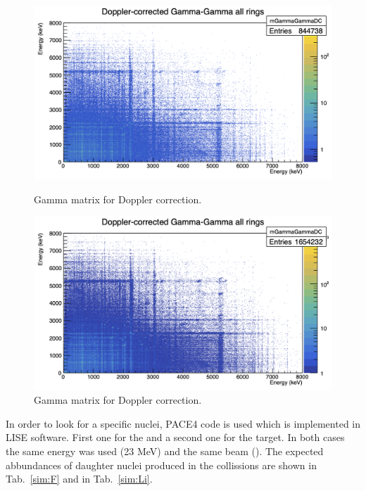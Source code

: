 \begin{figure}[h]
  \centering
  \begin{minipage}[b]{0.45\textwidth}
    \vspace{5mm}
    \includegraphics[width=\textwidth]{img/matrix_F.png}
    \caption{Gamma matrix for  Doppler correction.}
    \label{matrix:F}
  \end{minipage}
  \hfill
  \begin{minipage}[b]{0.45\textwidth}
    \vspace{5mm}
    \includegraphics[width=\textwidth]{img/matrix_Li.png}
    \caption{Gamma matrix for  Doppler correction.}
    \label{matrix:Li}
  \end{minipage}
\end{figure}

In order to look for a specific nuclei, PACE4 code is used which is
\cite{lise} implemented in LISE software. First one for the 
and a second one for the  target.
In both cases the same energy was used (23 MeV) and
the same beam (). The expected abbundances of daughter nuclei
produced in the collissions are shown in Tab.~\ref{sim:F} and in
Tab.~\ref{sim:Li}.

